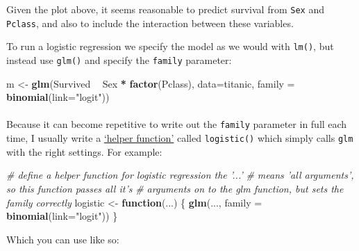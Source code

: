 \documentclass[]{article}
\newenvironment{Shaded}{\begin{snugshade}}{\end{snugshade}}
\newcommand{\CommentTok}[1]{\textcolor[rgb]{0.56,0.35,0.01}{\textit{#1}}}
\newcommand{\ControlFlowTok}[1]{\textcolor[rgb]{0.13,0.29,0.53}{\textbf{#1}}}
\newcommand{\DataTypeTok}[1]{\textcolor[rgb]{0.13,0.29,0.53}{#1}}
\newcommand{\KeywordTok}[1]{\textcolor[rgb]{0.13,0.29,0.53}{\textbf{#1}}}
\newcommand{\NormalTok}[1]{#1}
\newcommand{\OperatorTok}[1]{\textcolor[rgb]{0.81,0.36,0.00}{\textbf{#1}}}
\newcommand{\StringTok}[1]{\textcolor[rgb]{0.31,0.60,0.02}{#1}}
\let\oldparagraph\paragraph
\renewcommand{\paragraph}[1]{\oldparagraph{#1}\mbox{}}
\begin{document}
Given the plot above, it seems reasonable to predict survival from \texttt{Sex} and
\texttt{Pclass}, and also to include the interaction between these variables.

To run a logistic regression we specify the model as we would with \texttt{lm()}, but
instead use \texttt{glm()} and specify the \texttt{family} parameter:

\begin{Shaded}
\begin{Highlighting}[]
\NormalTok{m <-}\StringTok{ }\KeywordTok{glm}\NormalTok{(Survived }\OperatorTok{~}\StringTok{ }\NormalTok{Sex }\OperatorTok{*}\StringTok{ }\KeywordTok{factor}\NormalTok{(Pclass),}
         \DataTypeTok{data=}\NormalTok{titanic, }\DataTypeTok{family =} \KeywordTok{binomial}\NormalTok{(}\DataTypeTok{link=}\StringTok{"logit"}\NormalTok{))}
\end{Highlighting}
\end{Shaded}

\hypertarget{helper-function-logistic}{%
\paragraph{}\label{helper-function-logistic}}

Because it can become repetitive to write out the \texttt{family} parameter in full
each time, I usually write a \protect\hyperlink{helper-functions}{`helper function'} called
\texttt{logistic()} which simply calls \texttt{glm} with the right settings. For example:

\begin{Shaded}
\begin{Highlighting}[]
\CommentTok{# define a helper function for logistic regression the '...'}
\CommentTok{# means 'all arguments', so this function passes all it's}
\CommentTok{# arguments on to the glm function, but sets the family correctly}
\NormalTok{logistic <-}\StringTok{ }\ControlFlowTok{function}\NormalTok{(...) \{}
  \KeywordTok{glm}\NormalTok{(..., }\DataTypeTok{family =} \KeywordTok{binomial}\NormalTok{(}\DataTypeTok{link=}\StringTok{"logit"}\NormalTok{))}
\NormalTok{\}}
\end{Highlighting}
\end{Shaded}

Which you can use like so:
\end{document}
